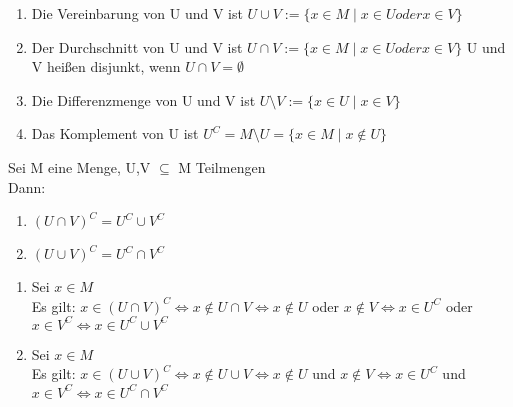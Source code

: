 \begin{enumerate}
\item Die Vereinbarung von U und V ist $U \cup V := \{x \in M \mid x \in U oder x \in V\}$
\item Der Durchschnitt von U und V ist $U \cap V := \{x \in M \mid x \in U oder x \in V\}$
U und V heißen disjunkt, wenn $U \cap V = \emptyset$
\item Die Differenzmenge von U und V ist $U \setminus V := \{x \in U \mid x \in V\}$
\item Das Komplement von U ist $U^C = M \setminus U = \{x \in M \mid x {\not\in} U\}$
%
\end{enumerate}
%
Sei M eine Menge, U,V $\subseteq$ M Teilmengen\\
Dann:
\begin{enumerate}
\item $(U \cap V)^C = U^C \cup V^C$
\item $(U \cup V)^C = U^C \cap V^C$
\end{enumerate}
%
\bew
\begin{enumerate}
\item{Sei $x \in M$\\Es gilt: $x \in (U \cap V)^C \Leftrightarrow x {\not\in} U \cap V \Leftrightarrow x {\not\in} U$ oder $x {\not\in} V\Leftrightarrow x \in U^C$ oder $x \in V^C \Leftrightarrow x\in U^C \cup V^C$}
\item{ Sei $x \in M$\\ Es gilt: $x \in (U \cup V)^C \Leftrightarrow x {\not\in} U \cup V \Leftrightarrow x {\not\in} U$ und $x {\not\in} V\Leftrightarrow x \in U^C$ und $x \in V^C \Leftrightarrow x\in U^C \cap V^C$}
\end{enumerate}
%
